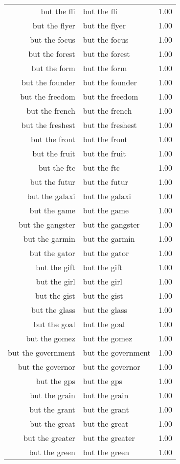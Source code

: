 \begin{table}[ht]
\begin{tabular}{rlr}
  but the fli & but the fli & 1.00 \\ 
  but the flyer & but the flyer & 1.00 \\ 
  but the focus & but the focus & 1.00 \\ 
  but the forest & but the forest & 1.00 \\ 
  but the form & but the form & 1.00 \\ 
  but the founder & but the founder & 1.00 \\ 
  but the freedom & but the freedom & 1.00 \\ 
  but the french & but the french & 1.00 \\ 
  but the freshest & but the freshest & 1.00 \\ 
  but the front & but the front & 1.00 \\ 
  but the fruit & but the fruit & 1.00 \\ 
  but the ftc & but the ftc & 1.00 \\ 
  but the futur & but the futur & 1.00 \\ 
  but the galaxi & but the galaxi & 1.00 \\ 
  but the game & but the game & 1.00 \\ 
  but the gangster & but the gangster & 1.00 \\ 
  but the garmin & but the garmin & 1.00 \\ 
  but the gator & but the gator & 1.00 \\ 
  but the gift & but the gift & 1.00 \\ 
  but the girl & but the girl & 1.00 \\ 
  but the gist & but the gist & 1.00 \\ 
  but the glass & but the glass & 1.00 \\ 
  but the goal & but the goal & 1.00 \\ 
  but the gomez & but the gomez & 1.00 \\ 
  but the government & but the government & 1.00 \\ 
  but the governor & but the governor & 1.00 \\ 
  but the gps & but the gps & 1.00 \\ 
  but the grain & but the grain & 1.00 \\ 
  but the grant & but the grant & 1.00 \\ 
  but the great & but the great & 1.00 \\ 
  but the greater & but the greater & 1.00 \\ 
  but the green & but the green & 1.00 \\ 

\end{tabular}
\end{table}

